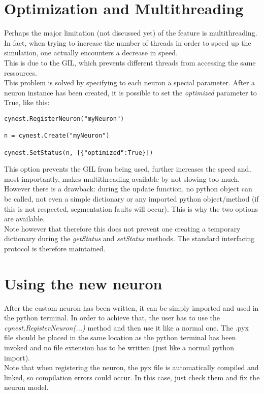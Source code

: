 \documentclass{article}
\begin{document}
\section{Optimization and Multithreading}
Perhaps the major limitation (not discussed yet) of the feature is multithreading. In fact, when trying to increase the number of threads in order to speed up the simulation, one actually encounters a decrease in speed.\\
This is due to the GIL, which prevents different threads from accessing the same ressources.\\
This problem is solved by specifying to each neuron a special parameter. After a neuron instance has been created, it is possible to set the \emph{optimized} parameter to True, like this:
\begin{verbatim}
cynest.RegisterNeuron("myNeuron")

n = cynest.Create("myNeuron")

cynest.SetStatus(n, [{"optimized":True}])
\end{verbatim}
This option prevents the GIL from being used, further increases the speed and, most importantly, makes multithreading available by not slowing too much.\\
However there is a drawback: during the update function, no python object can be called, not even a simple dictionary or any imported python object/method (if this is not respected, segmentation faults will occur). This is why the two options are available. \\
Note however that therefore this does not prevent one creating a temporary dictionary during the \emph{getStatus} and \emph{setStatus} methods. The standard interfacing protocol is therefore maintained.


\section{Using the new neuron}
After the custom neuron has been written, it can be simply imported and used in the python terminal. In order to achieve that, the user has to use the \emph{cynest.RegisterNeuron(...)} method and then use it like a normal one. The .pyx file should be placed in the same location as the python terminal has been invoked and no file extension has to be written (just like a normal python import).\\
Note that when registering the neuron, the pyx file is automatically compiled and linked, so compilation errors could occur. In this case, just check them and fix the neuron model.
\end{document}
